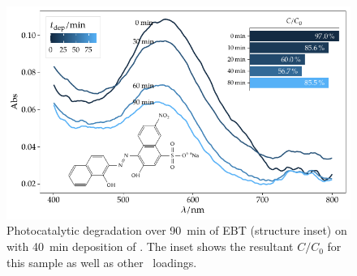 \documentclass[webedition,openright,titles,swedish,english]{LuaUUThesis}\usepackage[]{graphicx}\usepackage[]{xcolor}
\newenvironment{knitrout}{}{} %
\begin{document}
%









\begin{figure}[btp]
\centering
\begin{knitrout}\scriptsize
{}\color{fgcolor}

{\centering \includegraphics[width=4.72in]{figure/0501P-fig-photocat-1} 

}


\end{knitrout}
\caption[Photodegradation of EBT with ZnO/CdS]{%
   Photocatalytic degradation over \qty{90}{\minute} of \protect\gls{EBT} (structure inset)
   on \ZnO with \qty{40}{\minute} deposition of \CdS.
   The inset shows the resultant $C/C_0$ for this sample as well as other \CdS\ loadings.}
\label{fig:P01-photocat}
\end{figure}
\end{document}
